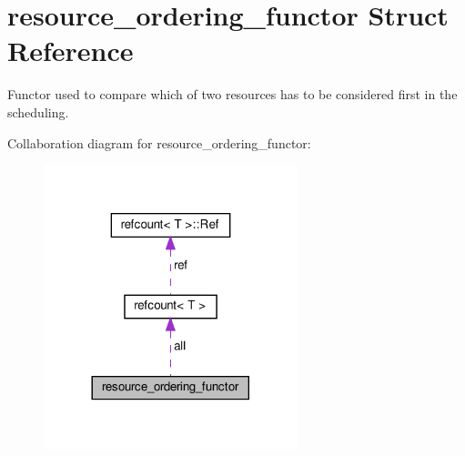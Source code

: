 \hypertarget{structresource__ordering__functor}{}\section{resource\+\_\+ordering\+\_\+functor Struct Reference}
\label{structresource__ordering__functor}


Functor used to compare which of two resources has to be considered first in the scheduling.  




Collaboration diagram for resource\+\_\+ordering\+\_\+functor\+:
\nopagebreak
\begin{figure}[H]
\begin{center}
\leavevmode
\includegraphics[width=209pt]{d1/dfe/structresource__ordering__functor__coll__graph}
\end{center}
\end{figure}

